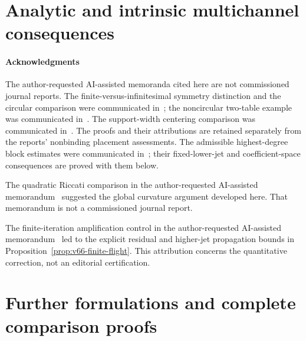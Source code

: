 \part{Analytic and intrinsic multichannel consequences}




















\subsection*{Acknowledgments}
The author-requested AI-assisted memoranda cited here are not commissioned
journal reports. The finite-versus-infinitesimal symmetry distinction and
the circular comparison were communicated in~\cite{A2ReviewV48}; the
noncircular two-table example was communicated in~\cite{A2ReviewV49}.
The support-width centering comparison was communicated
in~\cite{A2ReviewV51}. The proofs and their attributions are retained
separately from the reports' nonbinding placement assessments.
The admissible highest-degree block estimates were communicated
in~\cite{A2ReviewV57}; their fixed-lower-jet and coefficient-space
consequences are proved with them below.

The quadratic Riccati comparison in the author-requested AI-assisted
memorandum~\cite{A2ReviewV65} suggested the global curvature argument
developed here.  That memorandum is not a commissioned journal report.

The finite-iteration amplification control in the author-requested
AI-assisted memorandum~\cite{A2ReviewV66} led to the explicit residual
and higher-jet propagation bounds in
Proposition~\ref{prop:v66-finite-flight}.  This attribution concerns
the quantitative correction, not an editorial certification.

\appendix
\renewcommand{\thesection}{A.\arabic{section}}
\renewcommand{\theHsection}{principal.appendix.\arabic{section}}
\part{Further formulations and complete comparison proofs}









